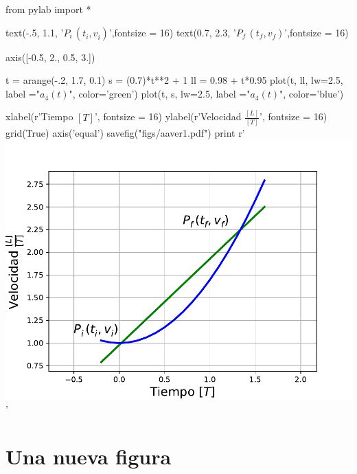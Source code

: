 \documentclass[12pt]{report}
\begin{document}
\begin{python}
from pylab import *

text(-.5, 1.1, '$P_i^{}\, (t_{i}^{},v_{i}^{})$',fontsize = 16)
text(0.7, 2.3, '$P_f^{} \,(t_{f}^{},v_{f}^{})$',fontsize = 16)

axis([-0.5, 2., 0.5, 3.])

t = arange(-.2, 1.7, 0.1)
s = (0.7)*t**2 + 1
ll = 0.98 + t*0.95
plot(t, ll, lw=2.5, label ="$a_{4}^{}(t)$", color='green')
plot(t, s, lw=2.5, label ="$a_{4}^{}(t)$", color='blue')

xlabel(r'Tiempo $[T]$', fontsize = 16)
ylabel(r'Velocidad $\frac{[L]}{[T]}$', fontsize = 16)
grid(True)
axis('equal')
savefig("figs/aaver1.pdf")
print r'\includegraphics[scale=0.4]{figs/aaver1}'
\end{python}



\section{Una nueva figura}
\end{document}
